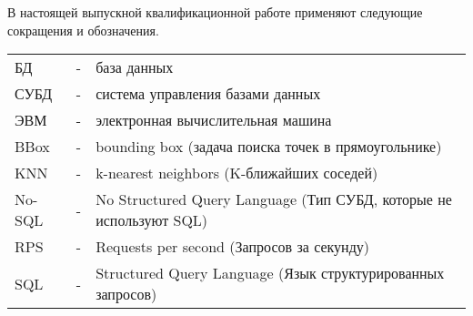 \Abbreviations %
В настоящей выпускной квалификационной работе применяют следующие
сокращения и обозначения.


\vspace{1em}

\noindent
\begin{tabularx}{\textwidth}{m{2cm} m{0.5cm} X}
БД & - & база данных \\
СУБД & - & система управления базами данных \\
ЭВМ & - & электронная вычислительная машина \\
BBox & - & bounding box (задача поиска точек в прямоугольнике) \\
KNN & - & k-nearest neighbors (K-ближайших соседей) \\
No-SQL & - & No Structured Query Language (Тип СУБД, которые не используют SQL) \\
RPS & - & Requests per second (Запросов за секунду) \\
SQL & - & Structured Query Language (Язык структурированных запросов) \\
\end{tabularx}

